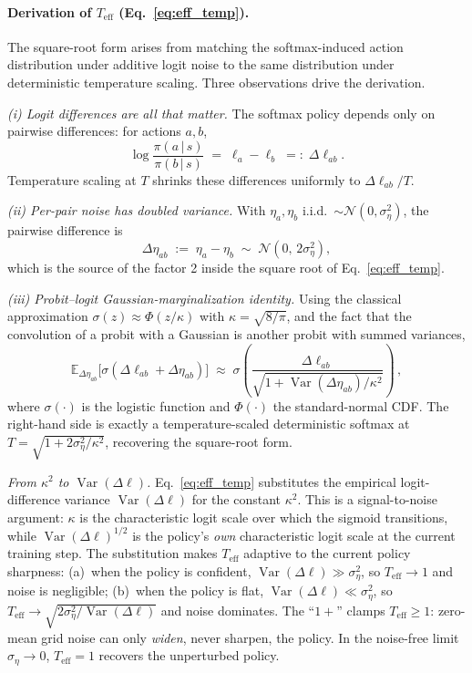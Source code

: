 \documentclass{article}
\theoremstyle{definition}
\theoremstyle{remark}
\DeclareMathOperator{\Var}{Var}
\newcommand{\Expect}{\mathbb{E}}
\newcommand{\cN}{\mathcal{N}}
\begin{document}
\paragraph{Derivation of $T_{\mathrm{eff}}$ (Eq.~\ref{eq:eff_temp}).}
The square-root form arises from matching the softmax-induced action distribution under additive logit noise to the same distribution under deterministic temperature scaling. Three observations drive the derivation.

\emph{(i) Logit differences are all that matter.} The softmax policy depends only on pairwise differences: for actions $a, b$,
\begin{equation}
\log \frac{\pi(a\,|\,s)}{\pi(b\,|\,s)} \;=\; \ell_a - \ell_b \;=:\; \Delta\ell_{ab}.
\end{equation}
Temperature scaling at $T$ shrinks these differences uniformly to $\Delta\ell_{ab}/T$.

\emph{(ii) Per-pair noise has doubled variance.} With $\eta_a, \eta_b$ i.i.d.\ $\sim\cN(0,\sigma_\eta^2)$, the pairwise difference is
\begin{equation}
\Delta\eta_{ab} \;:=\; \eta_a - \eta_b \;\sim\; \cN(0,\, 2\sigma_\eta^2),
\end{equation}
which is the source of the factor 2 inside the square root of Eq.~\ref{eq:eff_temp}.

\emph{(iii) Probit--logit Gaussian-marginalization identity.} Using the classical approximation $\sigma(z) \approx \Phi(z/\kappa)$ with $\kappa = \sqrt{8/\pi}$, and the fact that the convolution of a probit with a Gaussian is another probit with summed variances,
\begin{equation}
\label{eq:probit_logit_match}
\Expect_{\Delta\eta_{ab}}\!\bigl[\sigma(\Delta\ell_{ab} + \Delta\eta_{ab})\bigr]
\;\approx\;
\sigma\!\left(\frac{\Delta\ell_{ab}}{\sqrt{1 + \Var(\Delta\eta_{ab})/\kappa^2}}\right)\,,
\end{equation}
where $\sigma(\cdot)$ is the logistic function and $\Phi(\cdot)$ the standard-normal CDF. The right-hand side is exactly a temperature-scaled deterministic softmax at $T = \sqrt{1 + 2\sigma_\eta^2/\kappa^2}$, recovering the square-root form.

\emph{From $\kappa^2$ to $\Var(\Delta\ell)$.}
Eq.~\ref{eq:eff_temp} substitutes the empirical logit-difference variance $\Var(\Delta\ell)$ for the constant $\kappa^2$. This is a signal-to-noise argument: $\kappa$ is the characteristic logit scale over which the sigmoid transitions, while $\Var(\Delta\ell)^{1/2}$ is the policy's \emph{own} characteristic logit scale at the current training step. The substitution makes $T_{\mathrm{eff}}$ adaptive to the current policy sharpness: (a)~when the policy is confident, $\Var(\Delta\ell) \gg \sigma_\eta^2$, so $T_{\mathrm{eff}} \to 1$ and noise is negligible; (b)~when the policy is flat, $\Var(\Delta\ell) \ll \sigma_\eta^2$, so $T_{\mathrm{eff}} \to \sqrt{2\sigma_\eta^2/\Var(\Delta\ell)}$ and noise dominates. The ``$1{+}$'' clamps $T_{\mathrm{eff}} \ge 1$: zero-mean grid noise can only \emph{widen}, never sharpen, the policy. In the noise-free limit $\sigma_\eta\to 0$, $T_{\mathrm{eff}} = 1$ recovers the unperturbed policy.
\end{document}
